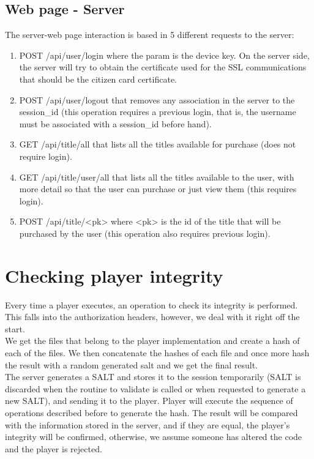 \documentclass[11pt,a4paper]{report}
\begin{document}
\subsection{Web page - Server}
The server-web page interaction is based in 5 different requests to the server:
\begin{enumerate}
\item POST  /api/user/login where the param is the device key. On the server side, the server will try to obtain the certificate used for the SSL communications that should be the citizen card certificate.
\item POST  /api/user/logout that removes any association in the server to the session\_id (this operation requires a previous login, that is, the username must be associated with a session\_id before hand).
\item GET   /api/title/all that lists all the titles available for purchase (does not require login).
\item GET   /api/title/user/all that lists all the titles available to the user, with more detail so that the user can purchase or just view them (this requires login).
\item POST  /api/title/<pk> where <pk> is the id of the title that will be purchased by the user (this operation also requires previous login).
\end{enumerate}

\section{Checking player integrity}
\label{sec:integrity}
Every time a player executes, an operation to check its integrity is performed. This falls into the authorization headers, however, we deal with it right off the start.\\

We get the files that belong to the player implementation and create a hash of each of the files. We then concatenate the hashes of each file and once more hash the result with a random generated salt and we get the final result.\\

The server generates a SALT and stores it to the session temporarily (SALT is discarded when the routine to validate is called or when requested to generate a new SALT), and sending it to the player. Player will execute the sequence of operations described before to generate the hash. The result will be compared with the information stored in the server, and if they are equal, the player's integrity will be confirmed, otherwise, we assume someone has altered the code and the player is rejected.
\end{document}
